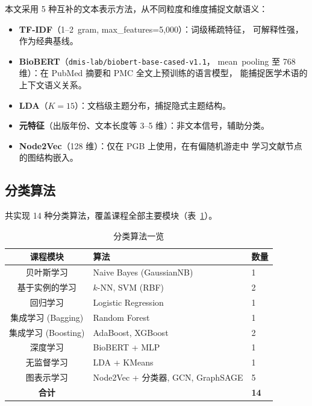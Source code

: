 \documentclass[12pt,a4paper]{ctexart}
\begin{document}
本文采用 5 种互补的文本表示方法，从不同粒度和维度捕捉文献语义：

\begin{itemize}
  \setlength{\itemsep}{-1pt}\setlength{\parsep}{0pt}
  \item \textbf{TF-IDF}（1--2~gram, max\_features=5,000）：词级稀疏特征，
  可解释性强，作为经典基线。
  \item \textbf{BioBERT}（\texttt{dmis-lab/biobert-base-cased-v1.1}，
  mean~pooling 至 768 维）：在 PubMed 摘要和 PMC 全文上预训练的语言模型，
  能捕捉医学术语的上下文语义关系。
  \item \textbf{LDA}（$K=15$）：文档级主题分布，捕捉隐式主题结构。
  \item \textbf{元特征}（出版年份、文本长度等 3--5 维）：非文本信号，辅助分类。
  \item \textbf{Node2Vec}（128 维）：仅在 PGB 上使用，在有偏随机游走中
  学习文献节点的图结构嵌入。
\end{itemize}

\subsection{分类算法}

共实现 14 种分类算法，覆盖课程全部主要模块（表~\ref{tab:algorithms}）。

\begin{table}[htbp]
\centering
\caption{分类算法一览}
\label{tab:algorithms}
\small
\begin{tabular}{cll}
\toprule
\textbf{课程模块} & \textbf{算法} & \textbf{数量} \\
\midrule
贝叶斯学习       & Naive Bayes (GaussianNB)         & 1 \\
基于实例的学习   & $k$-NN, SVM (RBF)                 & 2 \\
回归学习         & Logistic Regression               & 1 \\
集成学习 (Bagging)  & Random Forest                   & 1 \\
集成学习 (Boosting) & AdaBoost, XGBoost               & 2 \\
深度学习         & BioBERT + MLP                     & 1 \\
无监督学习       & LDA + KMeans                      & 1 \\
图表示学习       & Node2Vec + 分类器, GCN, GraphSAGE & 5 \\
\midrule
\textbf{合计}   & & \textbf{14} \\
\bottomrule
\end{tabular}
\end{table}
\end{document}
